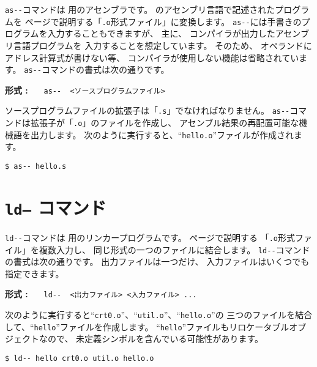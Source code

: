 \verb/as--/コマンドは \tac 用のアセンブラです。
\tac のアセンブリ言語で記述されたプログラムを
\pageref{app:oformat}ページで説明する「\verb/.o/形式ファイル」に変換します。
\verb/as--/には手書きのプログラムを入力することもできますが、
主に、
\cmm コンパイラが出力したアセンブリ言語プログラムを
入力することを想定しています。
そのため、
オペランドにアドレス計算式が書けない等、
\cmm コンパイラが使用しない機能は省略されています。
\verb/as--/コマンドの書式は次の通りです。

\begin{flushleft}
{\bf 形式 : }~~~\verb/as--  <ソースプログラムファイル>/
\end{flushleft}

ソースプログラムファイルの拡張子は「\verb/.s/」でなければなりません。
\verb/as--/コマンドは拡張子が「\verb/.o/」のファイルを作成し、
アセンブル結果の再配置可能な機械語を出力します。
次のように実行すると、``\verb/hello.o/''ファイルが作成されます。

\begin{mylist}
\begin{verbatim}
$ as-- hello.s
\end{verbatim}
\end{mylist}

\section{{\tt ld--} コマンド}

\verb/ld--/コマンドは \tac 用のリンカープログラムです。
\pageref{app:oformat}ページで説明する
「\verb/.o/形式ファイル」を複数入力し、
同じ形式の一つのファイルに結合します。
\verb/ld--/コマンドの書式は次の通りです。
出力ファイルは一つだけ、
入力ファイルはいくつでも指定できます。

\begin{flushleft}
{\bf 形式 : }~~~\verb/ld--  <出力ファイル> <入力ファイル> .../
\end{flushleft}

次のように実行すると``\verb/crt0.o/''、``\verb/util.o/''、``\verb/hello.o/''の
三つのファイルを結合して、``\verb/hello/''ファイルを作成します。
``\verb/hello/''ファイルもリロケータブルオブジェクトなので、
未定義シンボルを含んでいる可能性があります。

\begin{mylist}
\begin{verbatim}
$ ld-- hello crt0.o util.o hello.o
\end{verbatim}
\end{mylist}

